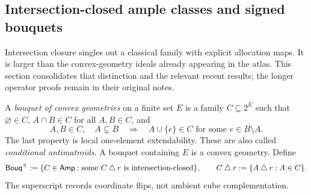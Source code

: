 \subsection{Intersection-closed ample classes and signed bouquets}
\label{sec:signed-bouquets}

Intersection closure singles out a classical family with explicit allocation
maps. It is larger than the convex-geometry ideals already appearing in the
atlas. This section consolidates that distinction and the relevant recent
results; the longer operator proofs remain in their original notes.

\begin{definition}
\label{def:atlas-signed-bouquets}
A \emph{bouquet of convex geometries} on a finite set $E$ is a family
$C\subseteq2^E$ such that $\varnothing\in C$, $A\cap B\in C$ for all
$A,B\in C$, and
\[
 A,B\in C,\quad A\subsetneq B
 \quad\Longrightarrow\quad
 A\cup\{e\}\in C\text{ for some }e\in B\setminus A.
\]
The last property is local one-element extendability. These are also called
\emph{conditional antimatroids}. A bouquet containing $E$ is a convex
geometry. Define
\[
 \mathsf{Bouq}^{\pm}
 :=\{C\in\mathsf{Amp}:\text{some }C\mathbin\triangle r
                  \text{ is intersection-closed}\},\qquad
 C\mathbin\triangle r:=\{A\mathbin\triangle r:A\in C\}.
\]
The superscript records coordinate flips, not ambient cube complementation.
\end{definition}

